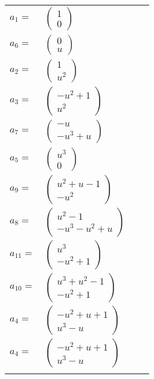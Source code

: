 \documentclass[1p]{elsarticle_modified}
\theoremstyle{definition}
\begin{document}
\begin{tabular}{m{7pt} m{180pt} m{7pt} m{180pt} }
\flushright $a_{1}=$&$\begin{pmatrix}1\\0\end{pmatrix}$ \\
\flushright $a_{6}=$&$\begin{pmatrix}0\\u\end{pmatrix}$ \\
\flushright $a_{2}=$&$\begin{pmatrix}1\\u^2\end{pmatrix}$ \\
\flushright $a_{3}=$&$\begin{pmatrix}- u^2+1\\u^2\end{pmatrix}$ \\
\flushright $a_{7}=$&$\begin{pmatrix}- u\\- u^3+u\end{pmatrix}$ \\
\flushright $a_{5}=$&$\begin{pmatrix}u^3\\0\end{pmatrix}$ \\
\flushright $a_{9}=$&$\begin{pmatrix}u^2+u-1\\- u^2\end{pmatrix}$ \\
\flushright $a_{8}=$&$\begin{pmatrix}u^2-1\\- u^3- u^2+u\end{pmatrix}$ \\
\flushright $a_{11}=$&$\begin{pmatrix}u^3\\- u^2+1\end{pmatrix}$ \\
\flushright $a_{10}=$&$\begin{pmatrix}u^3+u^2-1\\- u^2+1\end{pmatrix}$ \\
\flushright $a_{4}=$&$\begin{pmatrix}- u^2+u+1\\u^3- u\end{pmatrix}$\\ \flushright $a_{4}=$&$\begin{pmatrix}- u^2+u+1\\u^3- u\end{pmatrix}$\\&\end{tabular}
\end{document}

